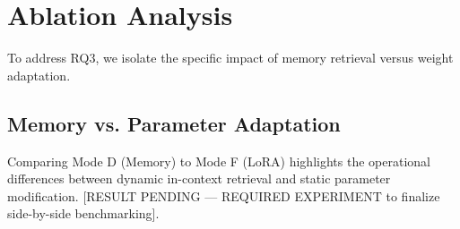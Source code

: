 \section{Ablation Analysis}
To address RQ3, we isolate the specific impact of memory retrieval versus weight adaptation.

\subsection{Memory vs. Parameter Adaptation}
Comparing Mode D (Memory) to Mode F (LoRA) highlights the operational differences between dynamic in-context retrieval and static parameter modification. 
[RESULT PENDING --- REQUIRED EXPERIMENT to finalize side-by-side benchmarking].
